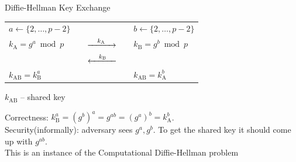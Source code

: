 \documentclass[usenames,dvipsnames, 9pt]{beamer}
\begin{document}
\begin{frame}{Diffie-Hellman Key Exchange}
\begin{center}
\begin{center}
\begin{tabular}{l c c c l}
			\pause
			$a \leftarrow \{2, \ldots, p-2 \}$ & & &  &  $b \leftarrow \{2, \ldots, p-2 \}$ \\
			\pause
			$k_\text{A} = g^a \bmod p$ & & $\xrightarrow{ \hspace{10pt } \Huge k_\text{A} \hspace{10pt } }$  &  & $k_\text{B} = g^b \bmod p$ \\
			\pause
		& & $\xleftarrow{ \hspace{10pt } \Huge k_\text{B} \hspace{10pt } }$  &  & \\
		\pause
		$k_\text{AB} =   k_\text{B}^a$ & &  &  & $k_\text{AB} =   k_\text{A}^b$ 
		\end{tabular}
	\end{center}
\vspace{15pt}
{\color{Orange}$k_\text{AB}$} -- shared key \\[10pt]
\end{center}
\pause
{\color{Orange}Correctness:} $k_\text{B}^a = (g^b)^a = g^{ab} = (g^a)^b=  k_\text{A}^b$.\\[5pt]
{\color{Orange}Security(informally): } adversary sees $g^a, g^b$. To get the shared key it  should come up with $g^{ab}$. \\
This is an instance of the {\color{Orange} Computational Diffie-Hellman problem}
\end{frame}
\end{document}
